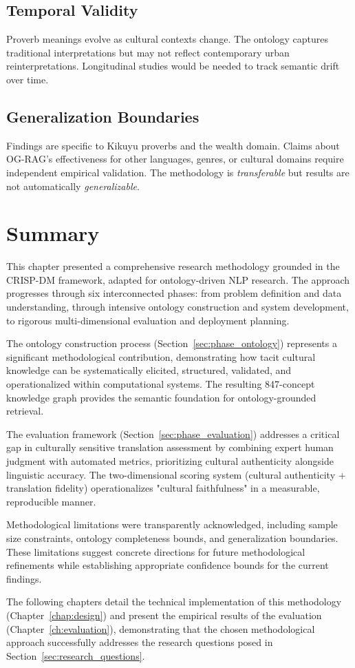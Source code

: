 \subsection{Temporal Validity}
\label{subsec:temporal_validity}

Proverb meanings evolve as cultural contexts change. The ontology captures traditional interpretations but may not reflect contemporary urban reinterpretations. Longitudinal studies would be needed to track semantic drift over time.

\subsection{Generalization Boundaries}
\label{subsec:generalization}

Findings are specific to Kikuyu proverbs and the wealth domain. Claims about OG-RAG's effectiveness for other languages, genres, or cultural domains require independent empirical validation. The methodology is \emph{transferable} but results are not automatically \emph{generalizable}.

\section{Summary}
\label{sec:methodology_summary}

This chapter presented a comprehensive research methodology grounded in the CRISP-DM framework, adapted for ontology-driven NLP research. The approach progresses through six interconnected phases: from problem definition and data understanding, through intensive ontology construction and system development, to rigorous multi-dimensional evaluation and deployment planning.

The ontology construction process (Section~\ref{sec:phase_ontology}) represents a significant methodological contribution, demonstrating how tacit cultural knowledge can be systematically elicited, structured, validated, and operationalized within computational systems. The resulting 847-concept knowledge graph provides the semantic foundation for ontology-grounded retrieval.

The evaluation framework (Section~\ref{sec:phase_evaluation}) addresses a critical gap in culturally sensitive translation assessment by combining expert human judgment with automated metrics, prioritizing cultural authenticity alongside linguistic accuracy. The two-dimensional scoring system (cultural authenticity + translation fidelity) operationalizes "cultural faithfulness" in a measurable, reproducible manner.

Methodological limitations were transparently acknowledged, including sample size constraints, ontology completeness bounds, and generalization boundaries. These limitations suggest concrete directions for future methodological refinements while establishing appropriate confidence bounds for the current findings.

The following chapters detail the technical implementation of this methodology (Chapter~\ref{chap:design}) and present the empirical results of the evaluation (Chapter~\ref{ch:evaluation}), demonstrating that the chosen methodological approach successfully addresses the research questions posed in Section~\ref{sec:research_questions}.
